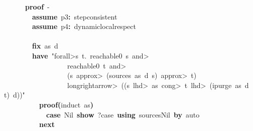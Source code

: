 \documentclass{article}
\newcommand{\syntaxKEYWORDA}[1]{\textcolor[rgb]{0.0,0.4,0.6}{\textbf{#1}}}
\newcommand{\syntaxKEYWORDC}[1]{\textcolor[rgb]{0.0,0.6,1.0}{\textbf{#1}}}
\newcommand{\syntaxLITERALA}[1]{\textcolor[rgb]{1.0,0.0,0.8}{#1}}
\newcommand{\syntaxOPERATOR}[1]{\textcolor[rgb]{0.0,0.0,0.0}{\textbf{#1}}}
\newcommand{\syntaxKEYWORDA}[1]{\textcolor[rgb]{0.0,0.4,0.6}{\textbf{#1}}}
\newcommand{\syntaxKEYWORDC}[1]{\textcolor[rgb]{0.0,0.6,1.0}{\textbf{#1}}}
\newcommand{\syntaxLITERALA}[1]{\textcolor[rgb]{1.0,0.0,0.8}{#1}}
\newcommand{\syntaxOPERATOR}[1]{\textcolor[rgb]{0.0,0.0,0.0}{\textbf{#1}}}
\newcommand{\syntaxKEYWORDA}[1]{\textcolor[rgb]{0.0,0.4,0.6}{\textbf{#1}}}
\newcommand{\syntaxKEYWORDC}[1]{\textcolor[rgb]{0.0,0.6,1.0}{\textbf{#1}}}
\newcommand{\syntaxLITERALA}[1]{\textcolor[rgb]{1.0,0.0,0.8}{#1}}
\newcommand{\syntaxOPERATOR}[1]{\textcolor[rgb]{0.0,0.0,0.0}{\textbf{#1}}}
\newcommand{\syntaxKEYWORDA}[1]{\textcolor[rgb]{0.0,0.4,0.6}{#1}}
\newcommand{\syntaxKEYWORDC}[1]{\textcolor[rgb]{0.0,0.6,1.0}{#1}}
\newcommand{\syntaxLITERALA}[1]{\textcolor[rgb]{1.0,0.0,0.8}{\textbf{#1}}}
\newcommand{\syntaxOPERATOR}[1]{\textcolor[rgb]{0.0,0.0,0.0}{#1}}
\newcommand{\syntaxKEYWORDA}[1]{\textcolor[rgb]{0.0,0.4,0.6}{\textbf{#1}}}
\newcommand{\syntaxKEYWORDC}[1]{\textcolor[rgb]{0.0,0.6,1.0}{\textbf{#1}}}
\newcommand{\syntaxLITERALA}[1]{\textcolor[rgb]{1.0,0.0,0.8}{#1}}
\newcommand{\syntaxOPERATOR}[1]{\textcolor[rgb]{0.0,0.0,0.0}{\textbf{#1}}}
\newcommand{\syntaxKEYWORDA}[1]{\textcolor[rgb]{0.0,0.4,0.6}{\textbf{#1}}}
\newcommand{\syntaxKEYWORDC}[1]{\textcolor[rgb]{0.0,0.6,1.0}{\textbf{#1}}}
\newcommand{\syntaxLITERALA}[1]{\textcolor[rgb]{1.0,0.0,0.8}{#1}}
\newcommand{\syntaxOPERATOR}[1]{\textcolor[rgb]{0.0,0.0,0.0}{\textbf{#1}}}
\begin{document}
{\ }{\ }{\ }{\ }{\ }{\ }\syntaxKEYWORDA{proof}{\ }{-}\hspace*{\fill}\\
{\ }{\ }{\ }{\ }{\ }{\ }{\ }{\ }\syntaxKEYWORDC{assume}{\ }p3\syntaxOPERATOR{:}{\ }step\usebox{\underscorebox}consistent\hspace*{\fill}\\
{\ }{\ }{\ }{\ }{\ }{\ }{\ }{\ }\syntaxKEYWORDC{assume}{\ }p4\syntaxOPERATOR{:}{\ }dynamic\usebox{\underscorebox}local\usebox{\underscorebox}respect\hspace*{\fill}\\
{\ }{\ }{\ }{\ }{\ }{\ }{\ }{\ }\syntaxKEYWORDA{\usebox{\opencurlybracket}}\hspace*{\fill}\\
{\ }{\ }{\ }{\ }{\ }{\ }{\ }{\ }\syntaxKEYWORDC{fix}{\ }as{\ }d\hspace*{\fill}\\
{\ }{\ }{\ }{\ }{\ }{\ }{\ }{\ }\syntaxKEYWORDA{have}{\ }\syntaxLITERALA{"\<forall>s{\ }t.{\ }reachable0{\ }s{\ }\<and>}\hspace*{\fill}\\
\syntaxLITERALA{{\ }{\ }{\ }{\ }{\ }{\ }{\ }{\ }{\ }{\ }{\ }{\ }{\ }{\ }{\ }{\ }{\ }{\ }reachable0{\ }t{\ }\<and>}\hspace*{\fill}\\
\syntaxLITERALA{{\ }{\ }{\ }{\ }{\ }{\ }{\ }{\ }{\ }{\ }{\ }{\ }{\ }{\ }{\ }{\ }{\ }{\ }(s{\ }\<approx>{\ }(sources{\ }as{\ }d{\ }s){\ }\<approx>{\ }t)}\hspace*{\fill}\\
\syntaxLITERALA{{\ }{\ }{\ }{\ }{\ }{\ }{\ }{\ }{\ }{\ }{\ }{\ }{\ }{\ }{\ }{\ }{\ }{\ }\<longrightarrow>{\ }((s{\ }\<lhd>{\ }as{\ }\<cong>{\ }t{\ }\<lhd>{\ }(ipurge{\ }as{\ }d{\ }{\ }t){\ }\usebox{\atbox}{\ }d))"}\hspace*{\fill}\\
{\ }{\ }{\ }{\ }{\ }{\ }{\ }{\ }{\ }{\ }\syntaxKEYWORDA{proof}\syntaxOPERATOR{(}induct{\ }as\syntaxOPERATOR{)}\hspace*{\fill}\\
{\ }{\ }{\ }{\ }{\ }{\ }{\ }{\ }{\ }{\ }{\ }{\ }\syntaxKEYWORDC{case}{\ }Nil{\ }\syntaxKEYWORDC{show}{\ }?case{\ }\syntaxKEYWORDA{using}{\ }sources\usebox{\underscorebox}Nil{\ }\syntaxKEYWORDA{by}{\ }auto\hspace*{\fill}\\
{\ }{\ }{\ }{\ }{\ }{\ }{\ }{\ }{\ }{\ }\syntaxKEYWORDA{next}\hspace*{\fill}\\
\end{document}
